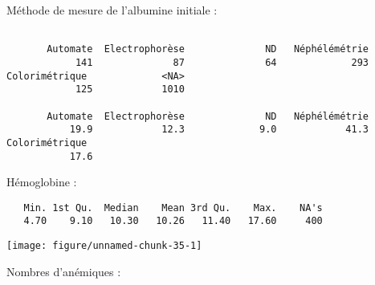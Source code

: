 \documentclass[11pt,a4paper]{article}\usepackage[]{graphicx}\usepackage[]{color}
\makeatletter
\def\maxwidth{ %
  \ifdim\Gin@nat@width>\linewidth
    \linewidth
  \else
    \Gin@nat@width
  \fi
}
\newenvironment{kframe}{%
 \def\at@end@of@kframe{}%
 \ifinner\ifhmode%
  \def\at@end@of@kframe{\end{minipage}}%
  \begin{minipage}{\columnwidth}%
 \fi\fi%
 \def\FrameCommand##1{\hskip\@totalleftmargin \hskip-\fboxsep
 \colorbox{shadecolor}{##1}\hskip-\fboxsep
     \hskip-\linewidth \hskip-\@totalleftmargin \hskip\columnwidth}%
 \MakeFramed {\advance\hsize-\width
   \@totalleftmargin\z@ \linewidth\hsize
   \@setminipage}}%
 {\par\unskip\endMakeFramed%
 \at@end@of@kframe}
\newenvironment{knitrout}{}{} %
\makeatother
\begin{document}
Méthode de mesure de l'albumine initiale :

\begin{knitrout}
\color{fgcolor}\begin{kframe}
\begin{verbatim}

       Automate  Electrophorèse              ND   Néphélémétrie 
            141              87              64             293 
Colorimétrique             <NA> 
            125            1010 

       Automate  Electrophorèse              ND   Néphélémétrie 
           19.9            12.3             9.0            41.3 
Colorimétrique  
           17.6 
\end{verbatim}
\end{kframe}
\end{knitrout}

Hémoglobine :

\begin{knitrout}
\color{fgcolor}\begin{kframe}
\begin{verbatim}
   Min. 1st Qu.  Median    Mean 3rd Qu.    Max.    NA's 
   4.70    9.10   10.30   10.26   11.40   17.60     400 
\end{verbatim}
\end{kframe}
\texttt{[image: figure/unnamed-chunk-35-1]} 

\end{knitrout}

Nombres d'anémiques :
\end{document}
